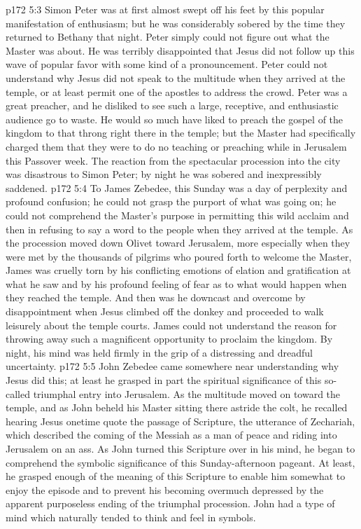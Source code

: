 \vs p172 5:3 Simon Peter was at first almost swept off his feet by this popular manifestation of enthusiasm; but he was considerably sobered by the time they returned to Bethany that night. Peter simply could not figure out what the Master was about. He was terribly disappointed that Jesus did not follow up this wave of popular favor with some kind of a pronouncement. Peter could not understand why Jesus did not speak to the multitude when they arrived at the temple, or at least permit one of the apostles to address the crowd. Peter was a great preacher, and he disliked to see such a large, receptive, and enthusiastic audience go to waste. He would so much have liked to preach the gospel of the kingdom to that throng right there in the temple; but the Master had specifically charged them that they were to do no teaching or preaching while in Jerusalem this Passover week. The reaction from the spectacular procession into the city was disastrous to Simon Peter; by night he was sobered and inexpressibly saddened.
\vs p172 5:4 To James Zebedee, this Sunday was a day of perplexity and profound confusion; he could not grasp the purport of what was going on; he could not comprehend the Master’s purpose in permitting this wild acclaim and then in refusing to say a word to the people when they arrived at the temple. As the procession moved down Olivet toward Jerusalem, more especially when they were met by the thousands of pilgrims who poured forth to welcome the Master, James was cruelly torn by his conflicting emotions of elation and gratification at what he saw and by his profound feeling of fear as to what would happen when they reached the temple. And then was he downcast and overcome by disappointment when Jesus climbed off the donkey and proceeded to walk leisurely about the temple courts. James could not understand the reason for throwing away such a magnificent opportunity to proclaim the kingdom. By night, his mind was held firmly in the grip of a distressing and dreadful uncertainty.
\vs p172 5:5 John Zebedee came somewhere near understanding why Jesus did this; at least he grasped in part the spiritual significance of this so\hyp{}called triumphal entry into Jerusalem. As the multitude moved on toward the temple, and as John beheld his Master sitting there astride the colt, he recalled hearing Jesus onetime quote the passage of Scripture, the utterance of Zechariah, which described the coming of the Messiah as a man of peace and riding into Jerusalem on an ass. As John turned this Scripture over in his mind, he began to comprehend the symbolic significance of this Sunday\hyp{}afternoon pageant. At least, he grasped enough of the meaning of this Scripture to enable him somewhat to enjoy the episode and to prevent his becoming overmuch depressed by the apparent purposeless ending of the triumphal procession. John had a type of mind which naturally tended to think and feel in symbols.
